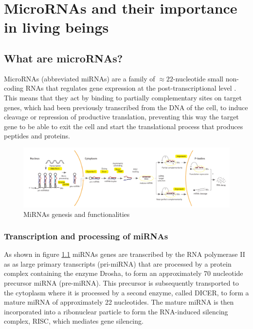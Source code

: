 
\chapter{MicroRNAs and their importance in living beings} %

\label{Chapter2} %


\section{What are microRNAs?}
MicroRNAs (abbreviated miRNAs) are a family of $\approx 22$-nucleotide small non-coding RNAs that regulates gene expression at the post-transcriptional level \cite{mirna_intro}. This means that they act by binding to partially complementary sites on target genes, which had been previously transcribed from the DNA of the cell, to induce cleavage or repression of productive translation, preventing this way the target gene to be able to exit the cell and start the translational process that produces peptides and proteins.

\begin{figure}[hbt!]
	\centering
	\includegraphics[width=1.0\textwidth]{Figures/mirna_genesis}
	\caption{MiRNAs genesis and functionalities}
	\label{fig:mirna_genesis}
\end{figure}

\subsection{Transcription and processing of miRNAs}
As shown in figure \ref{fig:mirna_genesis} miRNAs genes are transcribed by the RNA polymerase II as as large primary transcripts (pri-miRNA) that are processed by a protein complex containing the enzyme Drosha, to form an approximately 70 nucleotide precursor miRNA (pre-miRNA). This precursor is subsequently transported to the cytoplasm where it is processed by a second enzyme, called DICER, to form a mature miRNA of approximately 22 nucleotides. The mature miRNA is then incorporated into a ribonuclear particle to form the RNA-induced silencing complex, RISC, which mediates gene silencing.

